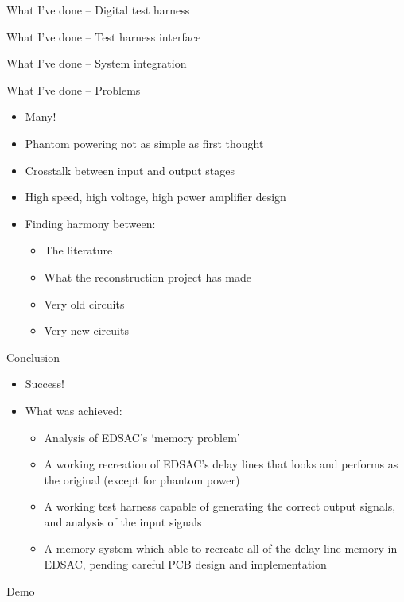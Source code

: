 \documentclass[aspectratio=169,11pt, xcolor={table}]{beamer}
\begin{document}
\begin{frame}{What I've done -- Digital test harness}

\end{frame}

\begin{frame}{What I've done -- Test harness interface}

\end{frame}

\begin{frame}{What I've done -- System integration}

\end{frame}

\begin{frame}{What I've done -- Problems}
	\begin{itemize}
		\item \alert{Many!}
		\item Phantom powering not as simple as first thought
		\item Crosstalk between input and output stages
		\item High speed, high voltage, high power amplifier design
		\item Finding harmony between:
		\begin{itemize}
			\item The literature
			\item What the reconstruction project has made
			\item Very old circuits
			\item Very new circuits
		\end{itemize}
	\end{itemize}
\end{frame}

\begin{frame}{Conclusion}
	\begin{itemize}
		\item \alert{Success!}
		\item What was achieved:
		\begin{itemize}
		\item Analysis of EDSAC's `memory problem'
		\item A working recreation of EDSAC's delay lines that looks and performs as the original (except for phantom power)
		\item A working test harness capable of generating the correct output signals, and analysis of the input signals
		\item A memory system which able to recreate all of the delay line memory in EDSAC, pending careful PCB design and implementation 
		\end{itemize}
	\end{itemize}
\end{frame}

\begin{frame}[standout]
	Demo
\end{frame}
\end{document}
